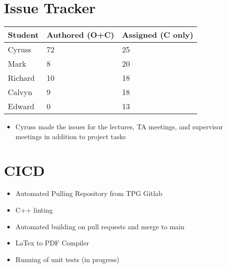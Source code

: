 \documentclass{article}
\begin{document}

\section{Issue Tracker}


\begin{table}[H]
\centering
\begin{tabular}{lll}
\toprule
\textbf{Student} & \textbf{Authored (O+C)} & \textbf{Assigned (C only)}\\
\midrule
Cyruss & 72 & 25 \\
Mark & 8 & 20 \\
Richard & 10 & 18 \\
Calvyn & 9 & 18 \\
Edward & 0 & 13 \\
\bottomrule
\end{tabular}
\end{table}

\begin{itemize}
    \item Cyruss made the issues for the lectures, TA meetings, and supervisor meetings in addition to project tasks
\end{itemize}

\section{CICD}

\begin{itemize}
    \item Automated Pulling Repository from TPG Gitlab
    \item C++ linting
    \item Automated building on pull requests and merge to main
    \item LaTex to PDF Compiler
    \item Running of unit tests (in progress)
\end{itemize}

\end{document}
